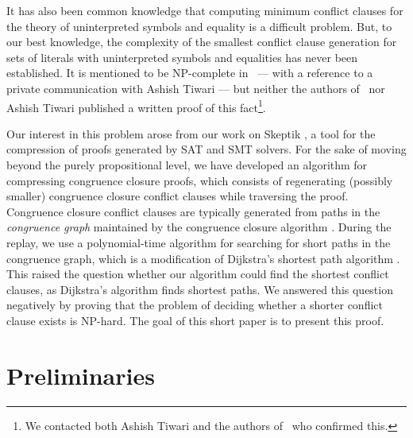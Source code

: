 \documentclass[smallextended]{svjour3}
\begin{document}
It has also been common knowledge that computing minimum conflict clauses for
the theory of uninterpreted symbols and equality is a difficult problem.  But,
to our best knowledge, the complexity of the smallest conflict clause generation
for sets of literals with uninterpreted symbols and equalities has never been
established.  It is mentioned to be NP-complete in~\cite{Nieuwenhuis6} --- with
a reference to a private communication with Ashish Tiwari --- but neither the
authors of~\cite{Nieuwenhuis6} nor Ashish Tiwari published a written proof of
this fact\footnote{We contacted both Ashish Tiwari and the authors
  of~\cite{Nieuwenhuis6} who confirmed this.}.

Our interest in this problem arose from our work on Skeptik \cite{Boudou1}, a tool for the compression of proofs generated by SAT and SMT solvers. For the sake of moving beyond the purely propositional level, we have developed an algorithm for compressing congruence closure proofs, which consists of regenerating (possibly smaller) congruence closure conflict clauses while traversing the proof. Congruence closure conflict clauses are typically generated from paths in the \emph{congruence graph} maintained by the congruence closure algorithm \cite{Fontaine2004,Nieuwenhuis6,Nieuwenhuis9}. During the replay, we use a polynomial-time algorithm for searching for short paths in the congruence graph, which is a modification of Dijkstra's shortest path algorithm \cite{Dijkstra1959}. This raised the question whether our algorithm could find the shortest conflict clauses, as Dijkstra's algorithm finds shortest paths. We answered this question negatively by proving that the problem of deciding whether a shorter conflict clause exists is NP-hard. The goal of this short paper is to present this proof.

\section*{Preliminaries}
\end{document}

